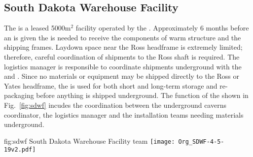 


\subsection{South Dakota Warehouse Facility}

The  is a leased 5000m$^2$ facility operated by the
.  Approximately 6 months before an  is given
the  is needed to receive the components of warm structure
and the  shipping frames. Laydown space near the Ross
headframe is extremely limited; therefore, careful coordination of
shipments to the Ross shaft is required. The  logistics
manager is responsible to coordinate shipments underground with the
 and . Since no materials or equipment may be
shipped directly to the Ross or Yates headframe, the  is
used for both short and long-term storage and re-packaging before
anything is shipped underground. The function of the 
shown in Fig.~\ref{fig:sdwf} incudes the coordination between the
underground caverns coordinator, the logistics manager and the
installation teams needing materials underground.
\begin{dunefigure}{fig:sdwf}
  {South Dakota Warehouse Facility team}
  \texttt{[image: Org\_SDWF-4-5-19v2.pdf]}
\end{dunefigure}

